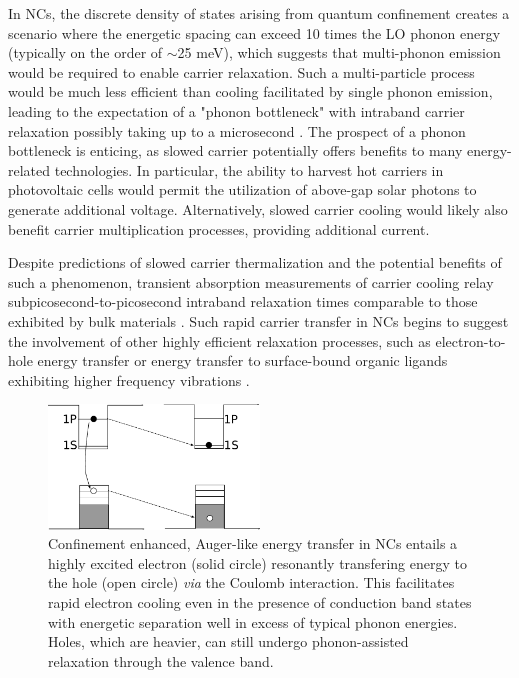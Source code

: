 In NCs, the discrete density of states arising from quantum confinement creates a scenario where the energetic spacing can exceed 10 times the LO phonon energy (typically on the order of $\sim$25 meV), which suggests that multi-phonon emission would be required to enable carrier relaxation. Such a multi-particle process would be much less efficient than cooling facilitated by single phonon emission, leading to the expectation of a "phonon bottleneck" with intraband carrier relaxation possibly taking up to a microsecond \cite{bockelmann1990phonon}. The prospect of a phonon bottleneck is enticing, as slowed carrier potentially offers benefits to many energy-related technologies. In particular, the ability to harvest hot carriers in photovoltaic cells would permit the utilization of above-gap solar photons to generate additional voltage. Alternatively, slowed carrier cooling would likely also benefit carrier multiplication processes, providing additional current. \par

Despite predictions of slowed carrier thermalization and the potential benefits of such a phenomenon, transient absorption measurements of carrier cooling relay subpicosecond-to-picosecond intraband relaxation times comparable to those exhibited by bulk materials \cite{PhysRevB.60.R2181, PhysRevLett.80.4028,PhysRevLett.96.057408}. Such rapid carrier transfer in NCs begins to suggest the involvement of other highly efficient relaxation processes, such as electron-to-hole energy transfer or energy transfer to surface-bound organic ligands exhibiting higher frequency vibrations \cite{pandey2008slow, guyot2005intraband}.\par

\begin{figure}
\begin{center}
\includegraphics[width=0.5\textwidth]{./Chapter1/auger.pdf}
\caption[Schematic of Auger-like electron-to-hole energy transfer in NCs.]{Confinement enhanced, Auger-like energy transfer in NCs entails a highly excited electron (solid circle) resonantly transfering energy to the hole (open circle) \emph{via} the Coulomb interaction. This facilitates rapid electron cooling even in the presence of conduction band states with energetic separation well in excess of typical phonon energies. Holes, which are heavier, can still undergo phonon-assisted relaxation through the valence band.}
\label{f:carrier_cooling2}
\end{center}
\end{figure}


